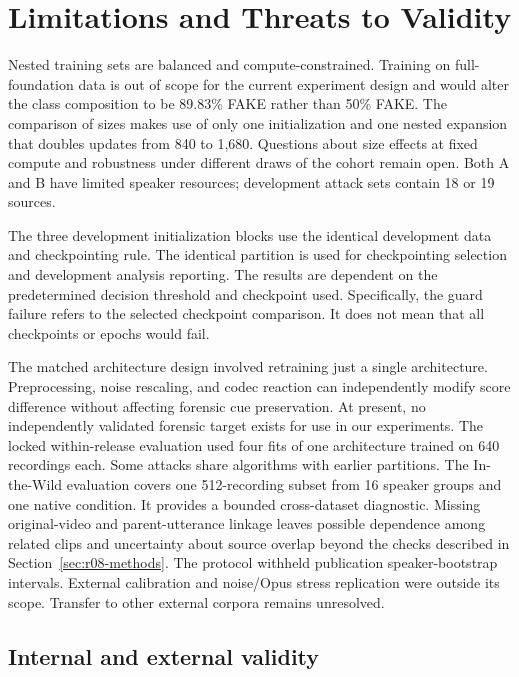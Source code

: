 \section{Limitations and Threats to Validity}\label{sec:limits}

Nested training sets are balanced and compute-constrained. Training on full-foundation data is out of scope for the current experiment design and would alter the class composition to be 89.83\% FAKE rather than 50\% FAKE. The comparison of sizes makes use of only one initialization and one nested expansion that doubles updates from 840 to 1,680. Questions about size effects at fixed compute and robustness under different draws of the cohort remain open. Both A and B have limited speaker resources; development attack sets contain 18 or 19 sources.

The three development initialization blocks use the identical development data and checkpointing rule. The identical partition is used for checkpointing selection and development analysis reporting. The results are dependent on the predetermined decision threshold and checkpoint used. Specifically, the guard failure refers to the selected checkpoint comparison. It does not mean that all checkpoints or epochs would fail.

The matched architecture design involved retraining just a single architecture. Preprocessing, noise rescaling, and codec reaction can independently modify score difference without affecting forensic cue preservation. At present, no independently validated forensic target exists for use in our experiments. The locked within-release evaluation used four fits of one architecture trained on 640 recordings each. Some attacks share algorithms with earlier partitions. The In-the-Wild evaluation covers one 512-recording subset from 16 speaker groups and one native condition. It provides a bounded cross-dataset diagnostic. Missing original-video and parent-utterance linkage leaves possible dependence among related clips and uncertainty about source overlap beyond the checks described in Section~\ref{sec:r08-methods}. The protocol withheld publication speaker-bootstrap intervals. External calibration and noise/Opus stress replication were outside its scope. Transfer to other external corpora remains unresolved.

\subsection{Internal and external validity}

